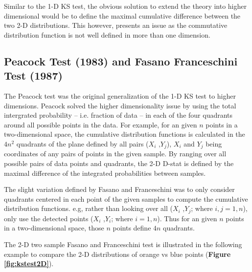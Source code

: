 \documentclass[codesnippet]{jss}
\begin{document}
Similar to the 1-D KS test, the obvious solution to extend the theory into higher dimensional would be to define the maximal cumulative difference between the two 2-D distributions. This however, presents an issue as the commutative distribution function is not well defined in more than one dimension\citep{Peacock1983}.

\subsection{Peacock Test (1983) and Fasano Franceschini Test (1987)}
The Peacock test was the original generalization of the 1-D KS test to higher dimensions. Peacock solved the higher dimensionality issue by using the total intergrated probability -- i.e. fraction of data -- in each of the four quadrants around all possible points in the data. For example, for an given $n$ points in a two-dimensional space, the cumulative distribution functions is calculated in the $4n^2$ quadrants of the plane defined by all pairs ($X_i$ ,$Y_j$), $X_i$ and $Y_j$ being coordinates of any pairs of points in the given sample. By ranging over all possible pairs of data points and quadrants, the 2-D D-stat is defined by the maximal difference of the integrated probabilities between samples.

The slight variation defined by Fasano and Franceschini was to only consider quadrants centered in each point of the given samples to compute the cumulative distribution functions. e.g, rather than looking over all ($X_i$ ,$Y_j$; where $i,j={1,n}$), only use the detected points ($X_i$ ,$Y_i$; where $i={1,n}$). Thus for an given $n$ points in a two-dimensional space, those $n$ points define $4n$ quadrants.

The 2-D two sample Fasano and Franceschini test is illustrated in the following example to compare the 2-D distributions of orange vs blue points (\textbf{Figure \ref{fig:kstest2D}}).
\end{document}
